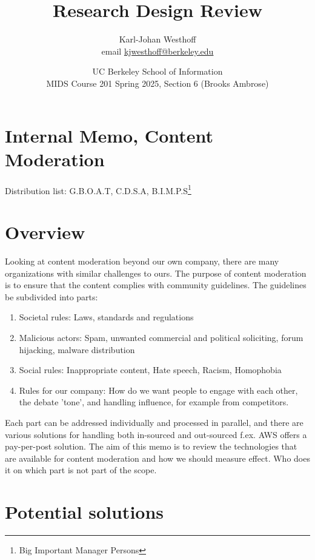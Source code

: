 \documentclass[
	letterpaper, %
	12pt, %
	unnumberedsections, %
	twoside, %
]{LTJournalArticle}
\title{Research Design Review} %
\author{
	Karl-Johan Westhoff \\
	email \href{mailto:kjwesthoff@berkeley.edu}{kjwesthoff@berkeley.edu}
}
\date{UC Berkeley School of Information \\
MIDS Course 201 Spring 2025, Section 6 (Brooks Ambrose)
}
\begin{document}
\onecolumn
\maketitle %





\section*{Internal Memo, Content Moderation}
Distribution list: G.B.O.A.T, C.D.S.A, B.I.M.P.S\footnote{Big Important Manager Persons}





\section*{Overview}
Looking at content moderation beyond our own company, there are many organizations with similar challenges to ours. The purpose of content moderation is to ensure that the content complies with community guidelines. The guidelines be subdivided into parts:

\begin{enumerate}[label=(\Alph*)]
	\item Societal rules: Laws, standards and regulations
	\item Malicious actors: Spam, unwanted commercial and political soliciting, forum hijacking, malware distribution
	\item Social rules: Inappropriate content, Hate speech, Racism, Homophobia
	\item Rules for our company: How do we want people to engage with each other, the debate 'tone', and handling influence, for example from competitors.
\end{enumerate}

Each part can be addressed individually and processed in parallel, and there are various solutions for handling both in-sourced and out-sourced f.ex. AWS\cite{AWS_contentModeration} offers a pay-per-post solution. The aim of this memo is to review the technologies that are available for content moderation and how we should measure effect. Who does it on which part is not part of the scope.


\section{Potential solutions}
\end{document}
